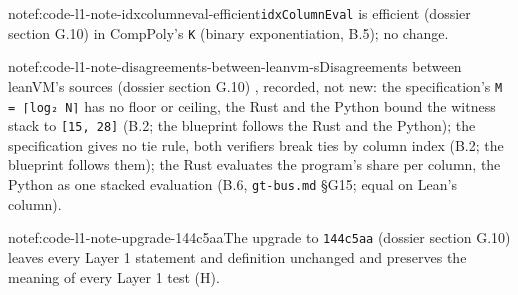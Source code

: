 \begin{finding}{note}{f:code-l1-note-idxcolumneval-efficient}{\texttt{idxColumnEval} is efficient (dossier section G.10)}
in CompPoly's \texttt{K} (binary exponentiation, B.5); no change.

\end{finding}

\begin{finding}{note}{f:code-l1-note-disagreements-between-leanvm-s}{Disagreements between leanVM's sources (dossier section G.10)}
, recorded, not new: the specification's \texttt{M = ⌈log₂ N⌉} has no floor or ceiling, the Rust and the Python bound the witness stack to \texttt{[15,\allowbreak{} 28]} (B.2; the blueprint follows the Rust and the Python); the specification gives no tie rule, both verifiers break ties by column index (B.2; the blueprint follows them); the Rust evaluates the program's share per column, the Python as one stacked evaluation (B.6, \texttt{gt-{}bus.\allowbreak{}md} §G15; equal on Lean's column).

\end{finding}

\begin{finding}{note}{f:code-l1-note-upgrade-144c5aa}{The upgrade to \texttt{144c5aa} (dossier section G.10)}
leaves every Layer 1 statement and definition unchanged and preserves the meaning of every Layer 1 test (H).

\end{finding}

